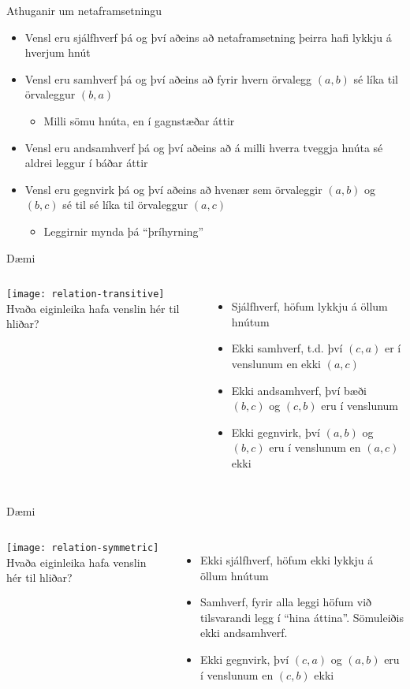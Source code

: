 \documentclass[handout]{beamer}
\begin{document}
\begin{frame}{Athuganir um netaframsetningu}
    \begin{itemize}
        \item Vensl eru sjálfhverf þá og því aðeins að netaframsetning þeirra hafi lykkju á hverjum hnút
        \item Vensl eru samhverf þá og því aðeins að fyrir hvern örvalegg $(a,b)$ sé líka til örvaleggur $(b, a)$
        \begin{itemize}
        \item Milli sömu hnúta, en í gagnstæðar áttir
        \end{itemize}
        \item Vensl eru andsamhverf þá og því aðeins að á milli hverra tveggja hnúta sé aldrei leggur í báðar áttir
        \item Vensl eru gegnvirk þá og því aðeins að hvenær sem örvaleggir $(a,b)$ og $(b,c)$ sé til sé líka til örvaleggur $(a,c)$
        \begin{itemize}
            \item Leggirnir mynda þá ``þríhyrning''
        \end{itemize}
    \end{itemize}
\end{frame}

\begin{frame}{Dæmi}
    \begin{columns}
        \texttt{[image: relation-transitive]}
        Hvaða eiginleika hafa venslin hér til hliðar? \pause
        \begin{itemize}
            \item Sjálfhverf, höfum lykkju á öllum hnútum
            \item Ekki samhverf, t.d. því $(c,a)$ er í venslunum en ekki $(a,c)$
            \item Ekki andsamhverf, því bæði $(b,c)$ og $(c,b)$ eru í venslunum 
            \item Ekki gegnvirk, því $(a,b)$ og $(b,c)$ eru í venslunum en $(a,c)$ ekki
        \end{itemize}
    \end{columns}
\end{frame}

\begin{frame}{Dæmi}
    \begin{columns}
        \texttt{[image: relation-symmetric]}
        Hvaða eiginleika hafa venslin hér til hliðar? \pause
        \begin{itemize}
            \item Ekki sjálfhverf, höfum ekki lykkju á öllum hnútum
            \item Samhverf, fyrir alla leggi höfum við tilsvarandi legg í ``hina áttina''. Sömuleiðis ekki andsamhverf.
            \item Ekki gegnvirk, því $(c,a)$ og $(a,b)$ eru í venslunum en $(c,b)$ ekki
        \end{itemize}
    \end{columns}
\end{frame}
\end{document}
